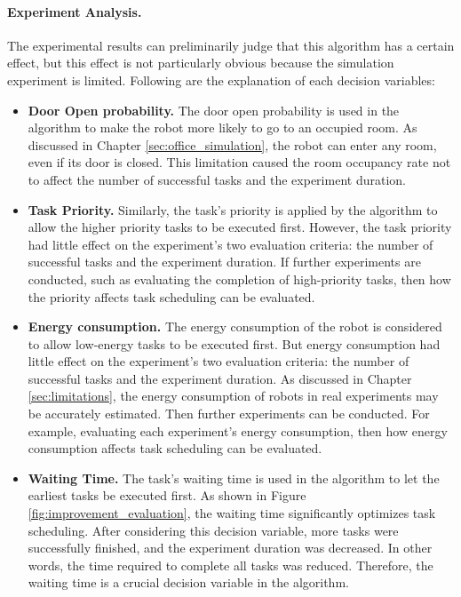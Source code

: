 \paragraph{Experiment Analysis.} 
The experimental results can preliminarily judge that this algorithm has a certain effect, but this effect is not particularly obvious because the simulation experiment is limited. Following are the explanation of each decision variables:
\begin{itemize}
 \item \textbf{Door Open probability.} The door open probability is used in the algorithm to make the robot more likely to go to an occupied room. As discussed in Chapter \ref{sec:office_simulation}, the robot can enter any room, even if its door is closed. This limitation caused the room occupancy rate not to affect the number of successful tasks and the experiment duration.
 \item \textbf{Task Priority.} Similarly, the task's priority is applied by the algorithm to allow the higher priority tasks to be executed first. However, the task priority had little effect on the experiment's two evaluation criteria: the number of successful tasks and the experiment duration. If further experiments are conducted, such as evaluating the completion of high-priority tasks, then how the priority affects task scheduling can be evaluated.
 \item \textbf{Energy consumption.} The energy consumption of the robot is considered to allow low-energy tasks to be executed first. But energy consumption had little effect on the experiment's two evaluation criteria: the number of successful tasks and the experiment duration. As discussed in Chapter \ref{sec:limitations}, the energy consumption of robots in real experiments may be accurately estimated. Then further experiments can be conducted. For example, evaluating each experiment's energy consumption, then how energy consumption affects task scheduling can be evaluated.
 \item \textbf{Waiting Time.} The task's waiting time is used in the algorithm to let the earliest tasks be executed first. As shown in Figure \ref{fig:improvement_evaluation}, the waiting time significantly optimizes task scheduling. After considering this decision variable, more tasks were successfully finished, and the experiment duration was decreased. In other words, the time required to complete all tasks was reduced. Therefore, the waiting time is a crucial decision variable in the algorithm.
\end{itemize}



